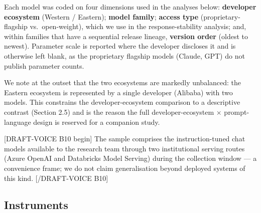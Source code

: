 \documentclass[
]{article}
\begin{document}
Each model was coded on four dimensions used in the analyses below:
\textbf{developer ecosystem} (Western / Eastern); \textbf{model family};
\textbf{access type} (proprietary-flagship vs.~open-weight), which we
use in the response-stability analysis; and, within families that have a
sequential release lineage, \textbf{version order} (oldest to newest).
Parameter scale is reported where the developer discloses it and is
otherwise left blank, as the proprietary flagship models (Claude, GPT)
do not publish parameter counts.

We note at the outset that the two ecosystems are markedly unbalanced:
the Eastern ecosystem is represented by a single developer (Alibaba)
with two models. This constrains the developer-ecosystem comparison to a
descriptive contrast (Section 2.5) and is the reason the full
developer-ecosystem × prompt-language design is reserved for a companion
study.

{[}DRAFT-VOICE B10 begin{]} The sample comprises the instruction-tuned
chat models available to the research team through two institutional
serving routes (Azure OpenAI and Databricks Model Serving) during the
collection window --- a convenience frame; we do not claim
generalisation beyond deployed systems of this kind. {[}/DRAFT-VOICE
B10{]}

\subsection{Instruments}\label{instruments}
\end{document}
